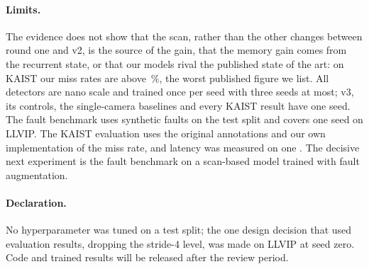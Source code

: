 \paragraph{Limits.}
The evidence does not show that the scan, rather than the other changes between round one and v2, is the source of the gain, that the memory gain comes from the recurrent state, or that our models rival the published state of the art: on KAIST our miss rates are above \sotaKaistMrMax{}\,\%, the worst published figure we list. All detectors are nano scale and trained once per seed with three seeds at most; v3, its controls, the single-camera baselines and every KAIST result have one seed. The fault benchmark uses synthetic faults on the test split and covers one seed on LLVIP. The KAIST evaluation uses the original annotations and our own implementation of the miss rate, and latency was measured on one \latLocalDevice{}. The decisive next experiment is the fault benchmark on a scan-based model trained with fault augmentation.

\paragraph{Declaration.}
No hyperparameter was tuned on a test split; the one design decision that used evaluation results, dropping the stride-4 level, was made on LLVIP at seed zero. Code and trained results will be released after the review period.
